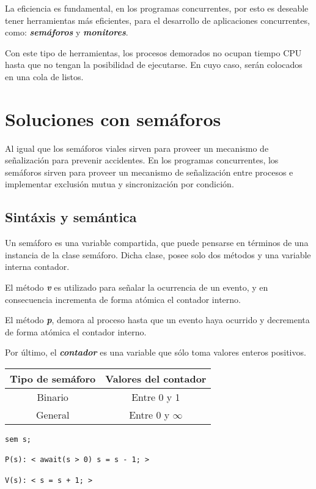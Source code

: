 \documentclass[a4paper, 10pt]{report}
\begin{document}
La eficiencia es fundamental, en los programas concurrentes, por esto es deseable tener herramientas más eficientes, para el desarrollo de aplicaciones concurrentes, como: \textbf{\emph{semáforos}} y \textbf{\emph{monitores}}. 

Con este tipo de herramientas, los procesos demorados no ocupan tiempo CPU hasta que no tengan la posibilidad de ejecutarse. En cuyo caso, serán colocados en una cola de listos.

\chapter{Soluciones con semáforos}
\vspace*{-10mm}

Al igual que los semáforos viales sirven para proveer un mecanismo de señalización para prevenir accidentes. En los programas concurrentes, los semáforos sirven para proveer un mecanismo de señalización entre procesos e implementar exclusión mutua y sincronización por condición.

\section{Sintáxis y semántica}

Un semáforo es una variable compartida, que puede pensarse en términos de una instancia de la clase semáforo. Dicha clase, posee solo dos métodos y una variable interna contador. 

El método \textbf{\emph{v}} es utilizado para señalar la ocurrencia de un evento, y en consecuencia incrementa de forma atómica el contador interno.

El método \textbf{\emph{p}}, demora al proceso hasta que un evento haya ocurrido y decrementa de forma atómica el contador interno.

Por último, el \textbf{\emph{contador}} es una variable que sólo toma valores enteros positivos.



\begin{multicols}{2}

    {\renewcommand{\arraystretch}{2}%
    \centering
    \begin{tabular}{cc}
        \textbf{Tipo de semáforo} & \textbf{Valores del contador}\\
        \hline 
        Binario & Entre 0 y 1\\ 
        General & Entre 0 y $\infty$\\ 
    \end{tabular}}

\begin{lstlisting}
sem s;

P(s): < await(s > 0) s = s - 1; >

V(s): < s = s + 1; >
\end{lstlisting}

\columnbreak


    
\end{multicols}
\end{document}
